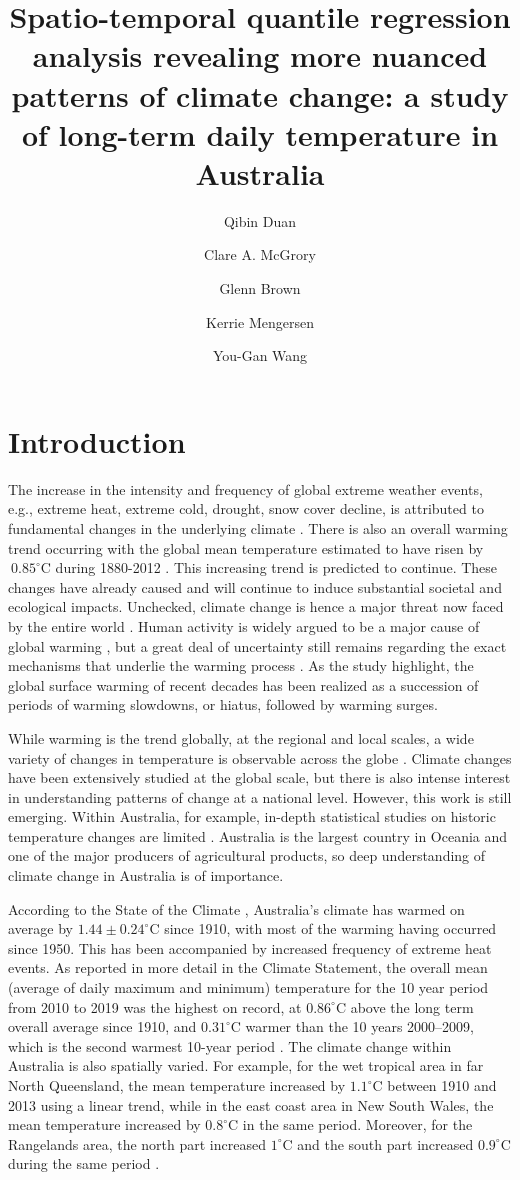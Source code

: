 \documentclass[fleqn,10pt]{wlscirep}
\title{\bf {Spatio-temporal quantile regression analysis revealing more nuanced patterns of climate change: a study of long-term daily temperature in Australia}}
\author[1]{Qibin Duan}
\author[1]{Clare A. McGrory}
\author[1]{Glenn Brown}
\author[1]{Kerrie Mengersen}
\author[1,*]{You-Gan Wang}
\affil[1]{School of Mathematical Sciences, Queensland University of Technology, Australia}
\affil[*]{you-gan.wang@qut.edu.au}
\newcommand{\dc}[1]{#1^{ \circ}\mathrm{C}}
\begin{document}
\flushbottom
\maketitle




\section*{Introduction}
The increase in the intensity and frequency of global extreme weather events, e.g., extreme heat, extreme cold, drought, snow cover decline, is attributed to  fundamental changes in the underlying climate  \cite{JC2,JC1}.  There is also an overall warming trend occurring with the global mean temperature estimated to have risen by  $~\dc{0.85}$ during 1880-2012 \cite{IPCC}. This increasing trend is predicted to continue.
These changes have already caused and will continue to induce substantial societal and ecological impacts. Unchecked, climate change is hence a major threat now faced by the entire world .
Human activity is widely argued to be a major cause of  global warming \cite{IPCC2007,IPCC2014}, but a great deal of uncertainty still remains regarding the exact mechanisms that underlie the warming process \cite{Sinha}. As the study \cite{Sinha} highlight, the global surface warming of recent decades has been realized as a succession of periods of warming slowdowns, or hiatus, followed by warming surges.


While warming is the trend globally, at the regional and local scales, a wide variety of changes in temperature is observable across the globe \cite{Alexander2006,Brown2008}. Climate changes have been extensively studied at the global scale, but there is also intense interest in understanding patterns of change at a national level\cite{Zhang}. However, this work is still emerging.  Within Australia, for example, in-depth statistical studies on historic temperature changes are limited \cite{QldTempRain}.  Australia is the largest country in Oceania and one of the major producers of agricultural products, so deep understanding of climate change in Australia is of importance.


According to the State of the Climate \cite{BOMCSIRO2020}, Australia's climate has warmed on average by $\dc{1.44\pm 0.24}$ since 1910, with most of the warming having occurred since 1950. This has been accompanied by increased frequency of extreme heat events.
As reported in more detail in the Climate Statement, the overall mean (average of daily maximum and minimum) temperature for the 10 year period from 2010 to 2019 was the highest on record, at $\dc{0.86}$ above the long term overall average since 1910, and $\dc{0.31}$ warmer than the 10 years 2000–2009, which is the second warmest 10-year period \cite{BOM2019}. The climate change within Australia is also spatially varied. For example, for the wet tropical area in far North Queensland, the mean temperature increased by $\dc{1.1}$ between 1910 and 2013 using a linear trend, while in the east coast area in New South Wales, the mean temperature increased by $\dc{0.8}$ in the same period. Moreover, for the Rangelands area, the north part increased $\dc{1}$ and the south part increased $\dc{0.9}$ during the same period \cite{Ekst2015}.
\end{document}
